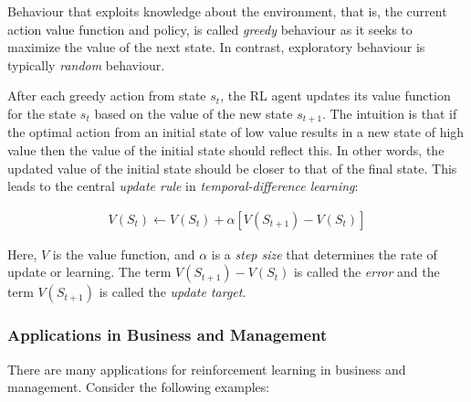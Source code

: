 Behaviour that exploits knowledge about the environment, that is, the current action value function and policy, is called \emph{greedy} behaviour as it seeks to maximize the value of the next state. In contrast, exploratory behaviour is typically \emph{random} behaviour. 

After each greedy action from state $s_t$, the RL agent updates its value function for the state $s_t$ based on the value of the new state $s_{t+1}$. The intuition is that if the optimal action from an initial state of low value results in a new state of high value then the value of the initial state should reflect this. In other words, the updated value of the initial state should be closer to that of the final state. This leads to the central \emph{update rule} in \emph{temporal-difference learning}:

\begin{align}
V(S_t) \leftarrow V(S_t) + \alpha \left[ V(S_{t+1}) - V(S_t)\right] \label{eq:1}
\end{align}

Here, $V$ is the value function, and $\alpha$ is a \emph{step size} that determines the rate of update or learning. The term $V(S_{t+1}) - V(S_t)$ is called the \emph{error} and the term $V(S_{t+1})$ is called the \emph{update target}.

\subsubsection*{Applications in Business and Management}

There are many applications for reinforcement learning in business and management. Consider the following examples:


